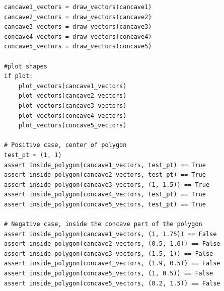 \documentclass{labReport}
\begin{document}
\begin{verbatim}
cancave1_vectors = draw_vectors(cancave1)
cancave2_vectors = draw_vectors(cancave2)
cancave3_vectors = draw_vectors(cancave3)
concave4_vectors = draw_vectors(concave4)
concave5_vectors = draw_vectors(concave5)

#plot shapes
if plot:
    plot_vectors(cancave1_vectors)
    plot_vectors(cancave2_vectors)
    plot_vectors(cancave3_vectors)
    plot_vectors(concave4_vectors)
    plot_vectors(concave5_vectors)

# Positive case, center of polygon
test_pt = (1, 1)
assert inside_polygon(cancave1_vectors, test_pt) == True
assert inside_polygon(cancave2_vectors, test_pt) == True
assert inside_polygon(cancave3_vectors, (1, 1.5)) == True
assert inside_polygon(concave4_vectors, test_pt) == True
assert inside_polygon(concave5_vectors, test_pt) == True

# Negative case, inside the concave part of the polygon
assert inside_polygon(cancave1_vectors, (1, 1.75)) == False
assert inside_polygon(cancave2_vectors, (0.5, 1.6)) == False
assert inside_polygon(cancave3_vectors, (1.5, 1)) == False
assert inside_polygon(concave4_vectors, (1.9, 0.5)) == False
assert inside_polygon(concave5_vectors, (1, 0.5)) == False
assert inside_polygon(concave5_vectors, (0.2, 1.5)) == False
\end{verbatim}
\end{document}
